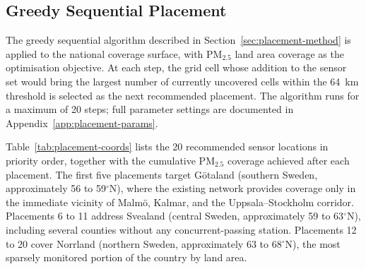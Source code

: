 \documentclass[11pt,a4paper]{article}
\let\oldsubsection\subsection
\renewcommand{\subsection}{\FloatBarrier\oldsubsection}
\begin{document}
\subsection{Greedy Sequential Placement}
\label{sec:greedy-results}

The greedy sequential algorithm described in Section~\ref{sec:placement-method} is applied to the national coverage surface, with PM$_{2.5}$ land area coverage as the optimisation objective. At each step, the grid cell whose addition to the sensor set would bring the largest number of currently uncovered cells within the 64~km threshold is selected as the next recommended placement. The algorithm runs for a maximum of 20 steps; full parameter settings are documented in Appendix~\ref{app:placement-params}.

Table~\ref{tab:placement-coords} lists the 20 recommended sensor locations in priority order, together with the cumulative PM$_{2.5}$ coverage achieved after each placement. The first five placements target Götaland (southern Sweden, approximately 56 to 59$^\circ$N), where the existing network provides coverage only in the immediate vicinity of Malmö, Kalmar, and the Uppsala--Stockholm corridor. Placements 6 to 11 address Svealand (central Sweden, approximately 59 to 63$^\circ$N), including several counties without any concurrent-passing station. Placements 12 to 20 cover Norrland (northern Sweden, approximately 63 to 68$^\circ$N), the most sparsely monitored portion of the country by land area.
\end{document}

